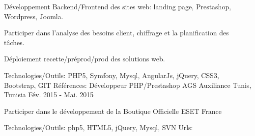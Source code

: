 \begin{cventries}
    {
      \begin{cvitems}
        \item {Développement Backend/Frontend des sites web: landing page, Prestashop, Wordpress, Joomla.}
        \item {Participer dans l'analyse des besoins client, chiffrage et la planification des tâches.}
        \item {Déploiement recette/préprod/prod des solutions web.}
      \end{cvitems}
    }
    {\textcolor{awesome}{Technologies/Outils: } {\color{graytext}}  {PHP5, Symfony, Mysql, AngularJs, jQuery, CSS3, Bootstrap, GIT}}
    {Références:} 
    {\href{http://www.tuttosport.tn/}{} \break
    \href{http://www.milddream.com/fr/ }{} \break
    \href{https://www.tvsoftconsult.com/ }{} \break
    \href{http://www.ordre-medecins.org.tn/fr/ }{} \break
    \href{http://orthodontiste-narimen-djerbi.com/ }{} \break
    }
  \techentries
    {Développeur PHP/Prestashop}
    {AGS Auxiliance}
    {Tunis, Tunisia}
    {Fév. 2015 - Mai. 2015}
    {
      \begin{cvitems}
        \item {Participer dans le développement de la Boutique Officielle ESET France}
      \end{cvitems}
    }
    {\textcolor{awesome}{Technologies/Outils: } {\color{graytext}}  {php5, HTML5, jQuery, Mysql, SVN}}
    {Urls:} 
    {\href{https://www.boutique-eset.com/}{} \break
    }
    { }\break
    { }\break
    { }\break
    { }\break
    { }\break
    { }\break
    { }\break
\end{cventries}
